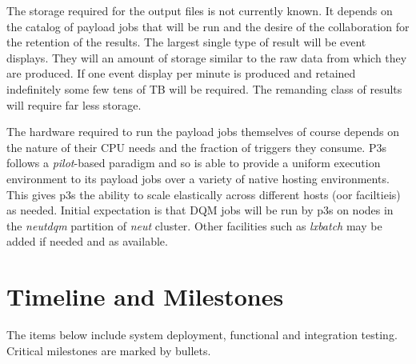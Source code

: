 \documentclass[pdftex,12pt,letter]{article}
\begin{document}
The storage required for the output files is not currently known.  It
depends on the catalog of payload jobs that will be run and the desire
of the collaboration for the retention of the results.  The largest
single type of result will be event displays.  They will an amount of
storage similar to the raw data from which they are produced.  If one
event display per minute is produced and retained indefinitely some
few tens of TB will be required.  The remanding class of results will
require far less storage.

The hardware required to run the payload jobs themselves of course
depends on the nature of their CPU needs and the fraction of triggers
they consume.  P3s follows a \textit{pilot}-based paradigm and so is
able to provide a uniform execution environment to its payload jobs
over a variety of native hosting environments.  This gives p3s the ability
to scale elastically across different hosts (oor faciltieis) as needed.  Initial expectation
is that DQM jobs will be run by p3s on nodes in the \textit{neutdqm}
partition of \textit{neut} cluster.  Other facilities such as
\textit{lxbatch} \cite{lxbatch} may be added if needed and as available.



\section{Timeline and Milestones}
\label{sec:timeline}
The items below include system deployment, functional and integration testing.
Critical milestones are marked by bullets.
\end{document}
